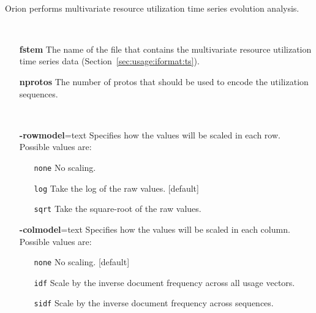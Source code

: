 \documentclass[]{article}
\begin{document}
\noindent
\begin{description}[align=left,style=nextline,leftmargin=*,font=\normalfont]

\item[{\bf\sf Description}]\mbox{}\\
   Orion performs multivariate resource utilization time series evolution analysis.

\item[{\bf\sf Parameters}]\mbox{}\\
  \vspace{-20pt} 
  \begin{itemize}[leftmargin=+.8in]
    \item[\bf fstem]
      The name of the file that contains the multivariate resource utilization
      time series data (Section~\ref{sec:usage:iformat:ts}).

    \item[\bf nprotos]
      The number of protos that should be used to encode the utilization sequences.
     
  \end{itemize}
  
  
\item[{\bf\sf Options}]\mbox{}\\
  \vspace{-20pt} 
  \begin{itemize}[leftmargin=+.8in]
    \item[\textbf{-rowmodel}=text]
       Specifies how the values will be scaled in each row.\\
       Possible values are:
  	   \vspace{-5pt} 
       \begin{itemize}[leftmargin=+.6in]
         \item[\tt none] No scaling.
         \item[\tt log]  Take the log of the raw values. [default]
         \item[\tt sqrt] Take the square-root of the raw values.
       \end{itemize}
       
    \item[\textbf{-colmodel}=text]
       Specifies how the values will be scaled in each column.\\
       Possible values are:
       \vspace{-5pt} 
       \begin{itemize}[leftmargin=+.6in]
         \item[\tt none] No scaling. [default]
         \item[\tt idf]  Scale by the inverse document frequency across all usage vectors.
         \item[\tt sidf] Scale by the inverse document frequency across sequences.
       \end{itemize}


\end{itemize}
\end{description}
\end{document}
